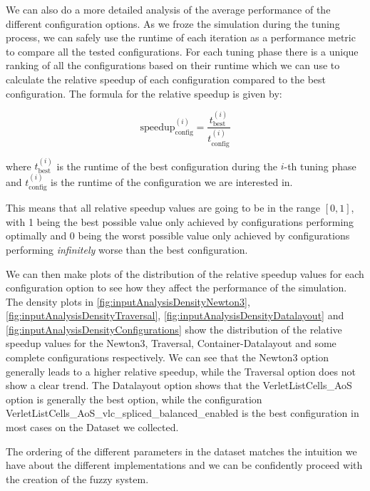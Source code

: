 We can also do a more detailed analysis of the average performance of the different configuration options. As we froze the simulation during the tuning process, we can safely use the runtime of each iteration as a performance metric to compare all the tested configurations. For each tuning phase there is a unique ranking of all the configurations based on their runtime which we can use to calculate the relative speedup of each configuration compared to the best configuration. The formula for the relative speedup is given by:

\begin{equation}
    {\text{speedup}^{(i)}_{\text{config}}}= \frac{t_{\text{best}}^{(i)}}{t_{\text{config}}^{(i)}}
\end{equation}

where $t_{\text{best}}^{(i)}$ is the runtime of the best configuration during the $i$-th tuning phase and $t_{\text{config}}^{(i)}$ is the runtime of the configuration we are interested in.

This means that all relative speedup values are going to be in the range $[0,1]$, with 1 being the best possible value only achieved by configurations performing optimally and 0 being the worst possible value only achieved by configurations performing \emph{infinitely} worse than the best configuration.

We can then make plots of the distribution of the relative speedup values for each configuration option to see how they affect the performance of the simulation. The density plots in \autoref{fig:inputAnalysisDensityNewton3}, \autoref{fig:inputAnalysisDensityTraversal}, \autoref{fig:inputAnalysisDensityDatalayout} and \autoref{fig:inputAnalysisDensityConfigurations} show the distribution of the relative speedup values for the Newton3, Traversal, Container-Datalayout and some complete configurations respectively. We can see that the Newton3 option generally leads to a higher relative speedup, while the Traversal option does not show a clear trend. The Datalayout option shows that the VerletListCells\_AoS option is generally the best option, while the configuration VerletListCells\_AoS\_vlc\_spliced\_balanced\_enabled is the best configuration in most cases on the Dataset we collected.

The ordering of the different parameters in the dataset matches the intuition we have about the different implementations and we can be confidently proceed with the creation of the fuzzy system.

